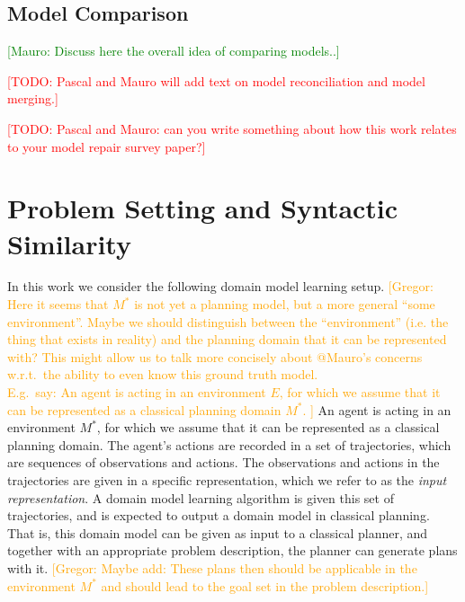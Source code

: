 \documentclass{article}
\theoremstyle{definition}
\theoremstyle{remark}
\newcommand{\realm}{\ensuremath{M^*}\xspace}
\newcommand{\todo}[1]{{\textcolor{red}{[TODO: #1]}}}
\newcommand{\roni}[1]{{\textcolor{red}{[Roni: #1]}}}
\newcommand{\mauro}[1]{{\textcolor{green}{[Mauro: #1]}}}
\newcommand{\gregor}[1]{{\textcolor{orange}{[Gregor: #1]}}}
\begin{document}
\subsection{Model Comparison}

\mauro{Discuss here the overall idea of comparing models..}

\todo{Pascal and Mauro will add text on model reconciliation and model merging.}

\todo{Pascal and Mauro: can you write something about how this work relates to your model repair survey paper?}





\section{Problem Setting and Syntactic Similarity}
\label{sec:problem-setting}


In this work we consider the following domain model learning setup. 
\gregor{Here it seems that $\realm$ is not yet a planning model, but a more general ``some environment''. Maybe we should distinguish between the ``environment'' (i.e. the thing that exists in reality) and the planning domain that it can be represented with? This might allow us to talk more concisely about @Mauro's concerns w.r.t.\ the ability to even know this ground truth model.\\
E.g.\ say: An agent is acting in an environment $E$, 
for which we assume that it can be represented as a classical planning domain $\realm$. }
An agent is acting in an environment $\realm$, 
for which we assume that it can be represented as a classical planning domain. 
The agent's actions are recorded in a set of trajectories, which are sequences of observations and actions. 
The observations and actions in the trajectories are given in a specific representation, which we refer to as the \emph{input representation}. 
A domain model learning algorithm is given this set of trajectories, and is expected to output a domain model in classical planning. 
That is, this domain model can be given as input to a classical planner, and together with an appropriate problem description, the planner can generate plans with it.
\gregor{Maybe add: These plans then should be applicable in the environment $\realm$ and should lead to the goal set in the problem description.}

\end{document}
